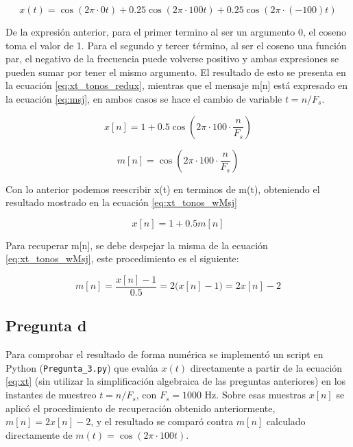 \documentclass[conference]{IEEEtran}
\begin{document}
\begin{equation}
x(t) = \cos(2\pi \cdot 0t) + 0.25\cos(2\pi \cdot 100t) + 0.25\cos(2\pi \cdot (-100)t)
\label{eq:xt_tonos_fn}
\end{equation}

De la expresión anterior, para el primer termino al ser un argumento 0, el coseno toma el valor de 1. 
Para el segundo y tercer término, al ser el coseno una función par, el negativo de la frecuencia puede volverse positivo y ambas expresiones se pueden sumar por tener el mismo argumento. 
El resultado de esto se presenta en la ecuación \eqref{eq:xt_tonos_redux}, mientras que el mensaje m[n] está expresado en la ecuación \eqref{eq:msj}, en ambos casos se hace el cambio de variable $t=n/F_s$.

\begin{equation}
x[n] = 1 + 0.5\cos\left(2\pi \cdot 100 \cdot \frac{n}{F_s}\right)
\label{eq:xt_tonos_redux}
\end{equation}

\begin{equation}
m[n] = \cos\left(2\pi \cdot 100\cdot \frac{n}{F_s}\right)
\label{eq:msj}
\end{equation}


Con lo anterior podemos reescribir x(t) en terminos de m(t), obteniendo el resultado mostrado en la ecuación \eqref{eq:xt_tonos_wMsj}

\begin{equation}
x[n] = 1 + 0.5m[n]
\label{eq:xt_tonos_wMsj}
\end{equation}

Para recuperar m[n], se debe despejar la misma de la ecuación \eqref{eq:xt_tonos_wMsj}, este procedimiento es el siguiente:


$$m[n] = \frac{x[n]-1}{0.5} = 2\big(x[n]-1\big) = 2x[n]-2$$



\subsection{Pregunta d}

Para comprobar el resultado de forma numérica se implementó un script en Python (\texttt{Pregunta\_3.py}) que evalúa $x(t)$ directamente a partir de la ecuación \eqref{eq:xt} (sin utilizar la simplificación algebraica de las preguntas anteriores) en los instantes de muestreo $t=n/F_s$, con $F_s = 1000$ Hz. 
Sobre esas muestras $x[n]$ se aplicó el procedimiento de recuperación obtenido anteriormente, $m[n] = 2x[n]-2$, y el resultado se comparó contra $m[n]$ calculado directamente de $m(t) = \cos(2\pi \cdot 100t)$.
\end{document}
